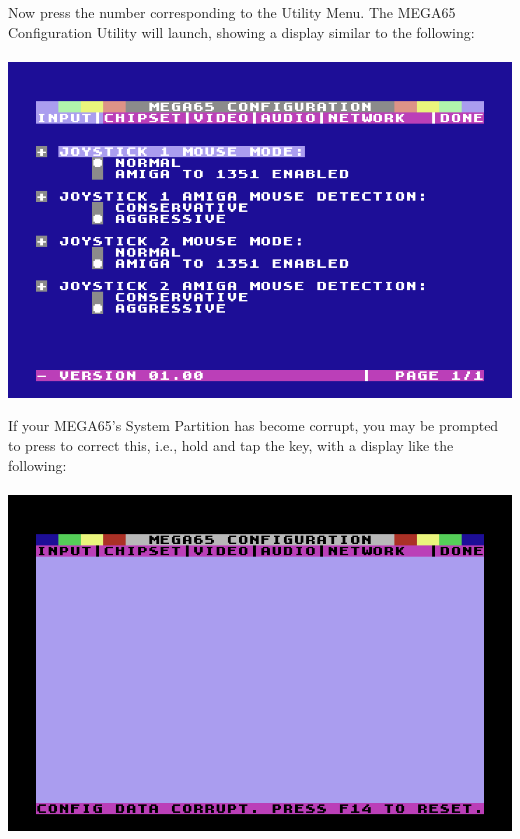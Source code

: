 \begin{minipage}{\linewidth}
  Now press the number corresponding to the Utility Menu.  The MEGA65
  Configuration Utility will launch, showing a display similar to
  the following: \\
  \\
  \includegraphics[width=\linewidth]{images/ss-m65config-1.png}
\end{minipage}

\begin{minipage}{\linewidth}
  If your MEGA65's System Partition has become corrupt, you may be
  prompted to press  to correct this, i.e., hold  and tap
  the  key, with a display like the following: \\
  \\
  \includegraphics[width=\linewidth]{images/ss-m65config-corrupt.png}
\end{minipage}

